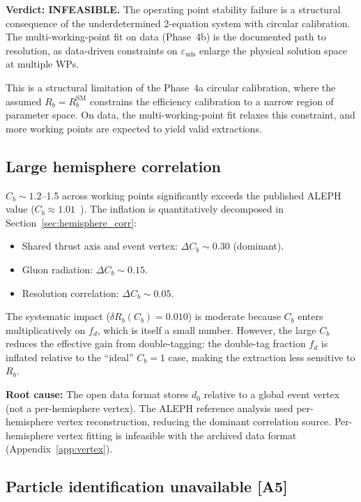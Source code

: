 \documentclass[11pt,a4paper]{article}
\begin{document}
\textbf{Verdict: INFEASIBLE.} The operating point stability failure is a structural
consequence of the underdetermined 2-equation system with circular calibration. The
multi-working-point fit on data (Phase~4b) is the documented path to resolution, as
data-driven constraints on $\varepsilon_\mathrm{uds}$ enlarge the physical solution
space at multiple WPs.

This is a structural limitation of the Phase~4a circular calibration, where the
assumed $R_b = R_b^\mathrm{SM}$ constrains the efficiency calibration to a narrow
region of parameter space. On data, the multi-working-point fit relaxes this
constraint, and more working points are expected to yield valid extractions.

\subsection{Large hemisphere correlation}

$C_b \sim 1.2$--1.5 across working points significantly exceeds the published ALEPH
value ($C_b \approx 1.01$~\cite{ALEPH:Rb:1996}). The inflation is quantitatively
decomposed in Section~\ref{sec:hemisphere_corr}:
\begin{itemize}
\item Shared thrust axis and event vertex: $\Delta C_b \sim 0.30$ (dominant).
\item Gluon radiation: $\Delta C_b \sim 0.15$.
\item Resolution correlation: $\Delta C_b \sim 0.05$.
\end{itemize}

The systematic impact ($\delta R_b(C_b) = 0.010$) is moderate because $C_b$ enters
multiplicatively on $f_d$, which is itself a small number. However, the large $C_b$
reduces the effective gain from double-tagging: the double-tag fraction $f_d$ is
inflated relative to the ``ideal'' $C_b = 1$ case, making the extraction less sensitive
to $R_b$.

\textbf{Root cause:} The open data format stores $d_0$ relative to a global event
vertex (not a per-hemisphere vertex). The ALEPH reference analysis used per-hemisphere
vertex reconstruction, reducing the dominant correlation source. Per-hemisphere vertex
fitting is infeasible with the archived data format (Appendix~\ref{app:vertex}).

\subsection{Particle identification unavailable [A5]}
\end{document}
